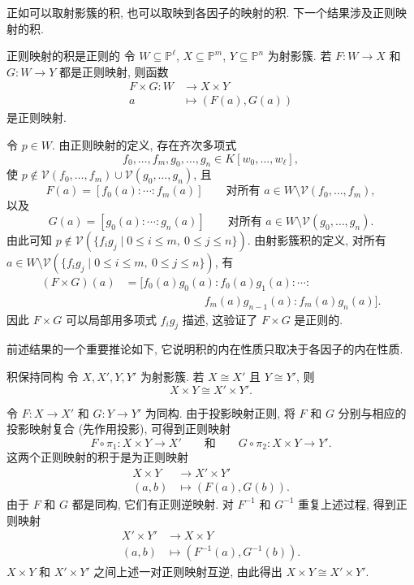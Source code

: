 正如可以取射影簇的积, 也可以取映到各因子的映射的积. 下一个结果涉及正则映射的积.

\begin{Proposition}{正则映射的积是正则的}\leavevmode\label{prop:products-of-projective-regular-maps-are-regular}
令 $W\subseteq\mathbb{P}^{\ell}$, $X\subseteq\mathbb{P}^{m}$, $Y\subseteq\mathbb{P}^{n}$ 为射影簇. 若 $F:W\to X$ 和 $G:W\to Y$ 都是正则映射, 则函数
\[
  \begin{aligned}
    F\times G:W&\to X\times Y\\
    a&\mapsto(F(a),G(a))
  \end{aligned}
\]
是正则映射.
\end{Proposition}
\begin{Proof}
令 $p\in W$. 由正则映射的定义, 存在齐次多项式
\[
  f_{0},\ldots,f_{m},g_{0},\ldots,g_{n}\in K[w_{0},\ldots,w_{\ell}],
\]
使 $p\notin\mathcal{V}(f_{0},\ldots,f_{m})\cup\mathcal{V}(g_{0},\ldots,g_{n})$, 且
\[
  F(a)=[f_{0}(a):\cdots:f_{m}(a)]
  \qquad\text{对所有 }a\in W\setminus\mathcal{V}(f_{0},\ldots,f_{m}),
\]
以及
\[
  G(a)=[g_{0}(a):\cdots:g_{n}(a)]
  \qquad\text{对所有 }a\in W\setminus\mathcal{V}(g_{0},\ldots,g_{n}).
\]
由此可知 $p\notin\mathcal{V}(\{f_{i}g_{j}\mid0\le i\le m,\ 0\le j\le n\})$. 由射影簇积的定义, 对所有 $a\in W\setminus\mathcal{V}(\{f_{i}g_{j}\mid0\le i\le m,\ 0\le j\le n\})$, 有
\[
  \begin{aligned}
  (F\times G)(a)
  &=[f_{0}(a)g_{0}(a):f_{0}(a)g_{1}(a):\cdots:\\
  &\hspace{7em}f_{m}(a)g_{n-1}(a):f_{m}(a)g_{n}(a)].
  \end{aligned}
\]
因此 $F\times G$ 可以局部用多项式 $f_{i}g_{j}$ 描述, 这验证了 $F\times G$ 是正则的.
\end{Proof}

前述结果的一个重要推论如下, 它说明积的内在性质只取决于各因子的内在性质.

\begin{Corollary}{积保持同构}\leavevmode\label{cor:products-preserve-projective-isomorphisms}
令 $X,X',Y,Y'$ 为射影簇. 若 $X\cong X'$ 且 $Y\cong Y'$, 则
\[
  X\times Y\cong X'\times Y'.
\]
\end{Corollary}
\begin{Proof}
令 $F:X\to X'$ 和 $G:Y\to Y'$ 为同构. 由于投影映射正则, 将 $F$ 和 $G$ 分别与相应的投影映射复合 (先作用投影), 可得到正则映射
\[
  F\circ\pi_{1}:X\times Y\to X'
  \qquad\text{和}\qquad
  G\circ\pi_{2}:X\times Y\to Y'.
\]
这两个正则映射的积于是为正则映射
\[
  \begin{aligned}
    X\times Y&\to X'\times Y'\\
    (a,b)&\mapsto(F(a),G(b)).
  \end{aligned}
\]
由于 $F$ 和 $G$ 都是同构, 它们有正则逆映射. 对 $F^{-1}$ 和 $G^{-1}$ 重复上述过程, 得到正则映射
\[
  \begin{aligned}
    X'\times Y'&\to X\times Y\\
    (a,b)&\mapsto(F^{-1}(a),G^{-1}(b)).
  \end{aligned}
\]
$X\times Y$ 和 $X'\times Y'$ 之间上述一对正则映射互逆, 由此得出 $X\times Y\cong X'\times Y'$.
\end{Proof}

